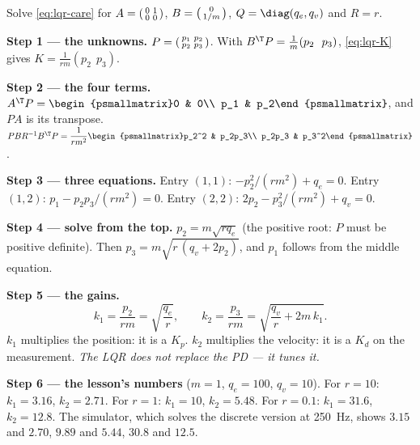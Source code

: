 \begin{example}
\label{ex:lqr-derive}
Solve \cref{eq:lqr-care} for $A = \begin{psmallmatrix}0 & 1\\ 0 & 0\end{psmallmatrix}$, $B = \begin{psmallmatrix}0\\ 1/m\end{psmallmatrix}$, $Q = \diag(q_e, q_v)$ and $R = r$.

\textbf{Step 1 — the unknowns.} $P = \begin{psmallmatrix}p_1 & p_2\\ p_2 & p_3\end{psmallmatrix}$. With $B^\T P = \tfrac1m(p_2\ \ p_3)$, \cref{eq:lqr-K} gives $K = \tfrac{1}{rm}(p_2\ \ p_3)$.

\textbf{Step 2 — the four terms.} $A^\T P = \begin{psmallmatrix}0 & 0\\ p_1 & p_2\end{psmallmatrix}$, and $PA$ is its transpose. $PBR^{-1}B^\T P = \dfrac{1}{rm^2}\begin{psmallmatrix}p_2^2 & p_2p_3\\ p_2p_3 & p_3^2\end{psmallmatrix}$.

\textbf{Step 3 — three equations.} Entry $(1,1)$: $-p_2^2/(rm^2) + q_e = 0$. Entry $(1,2)$: $p_1 - p_2p_3/(rm^2) = 0$. Entry $(2,2)$: $2p_2 - p_3^2/(rm^2) + q_v = 0$.

\textbf{Step 4 — solve from the top.} $p_2 = m\sqrt{rq_e}$ (the positive root: $P$ must be positive definite). Then $p_3 = m\sqrt{r\,(q_v + 2p_2)}$, and $p_1$ follows from the middle equation.

\textbf{Step 5 — the gains.}
\begin{equation}\label{eq:lqr-gains}
  k_1 = \frac{p_2}{rm} = \sqrt{\frac{q_e}{r}}, \qquad k_2 = \frac{p_3}{rm} = \sqrt{\frac{q_v}{r} + 2m\,k_1} .
\end{equation}
$k_1$ multiplies the position: it is a $K_p$. $k_2$ multiplies the velocity: it is a $K_d$ on the measurement. \emph{The LQR does not replace the PD — it tunes it.}

\textbf{Step 6 — the lesson's numbers} ($m = 1$, $q_e = 100$, $q_v = 10$). For $r = 10$: $k_1 = 3.16$, $k_2 = 2.71$. For $r = 1$: $k_1 = 10$, $k_2 = 5.48$. For $r = 0.1$: $k_1 = 31.6$, $k_2 = 12.8$. The simulator, which solves the discrete version at \SI{250}{Hz}, shows $3.15$ and $2.70$, $9.89$ and $5.44$, $30.8$ and $12.5$.
\end{example}

